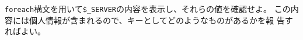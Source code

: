 \begin{Prob}\upshape\Must
 \texttt{foreach}構文を用いて\Verb+$_SERVER+の内容を表示し、それらの値を確認せよ。
 \ifText
この内容には個人情報が含まれるので、キーとしてどのようなものがあるかを報
 告すればよい。
 \fi
\end{Prob}

